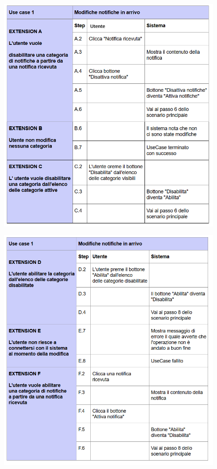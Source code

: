 \begin{figure}[H]
	\centering
	\includegraphics[width=1\linewidth]{"Immagini/cockburn/gestione notifiche estensioni 1.png"}
	\caption[CockBurn extensions: registra nuovo agente]{}
	\label{fig:gestione-notifiche-estensioni1}
\end{figure}

\newpage

\begin{figure}[H]
	\centering
	\includegraphics[width=1\linewidth]{"Immagini/cockburn/gestione notifiche estensioni 2.png"}
	\caption[CockBurn extensions: registra nuovo agente]{}
	\label{fig:gestione-notifiche-estensioni2}
\end{figure}